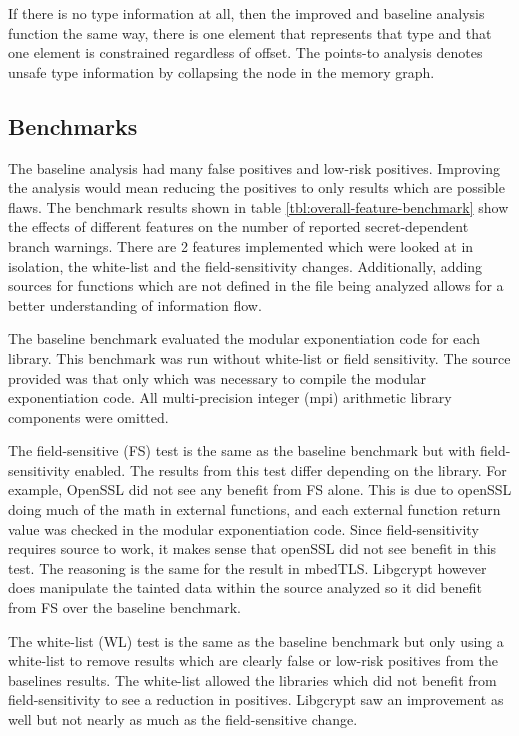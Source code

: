 If there is no type information at all, then the improved and baseline analysis
function the same way, there is one element that represents that type and that
one element is constrained regardless of offset. The points-to analysis denotes
unsafe type information by collapsing the node in the memory graph.
\subsection{Benchmarks}

The baseline analysis had many false positives and low-risk positives. Improving
the analysis would mean reducing the positives to only results which are
possible flaws. The benchmark results shown in table
\ref{tbl:overall-feature-benchmark} show the effects of different features on
the number of reported secret-dependent branch warnings. There are 2 features
implemented which were looked at in isolation, the white-list and the
field-sensitivity changes. Additionally, adding sources for functions which are
not defined in the file being analyzed allows for a better understanding of
information flow.

The baseline benchmark evaluated the modular exponentiation code for each
library. This benchmark was run without white-list or field sensitivity. The
source provided was that only which was necessary to compile the modular
exponentiation code. All multi-precision integer (mpi) arithmetic library components
were omitted.

The field-sensitive (FS) test is the same as the baseline benchmark but with
field-sensitivity enabled. The results from this test differ depending on the
library. For example, OpenSSL did not see any benefit from FS alone. This is due
to openSSL doing much of the math in external functions, and each external
function return value was checked in the modular exponentiation code. Since
field-sensitivity requires source to work, it makes sense that openSSL did not
see benefit in this test. The reasoning is the same for the result in mbedTLS.
Libgcrypt however does manipulate the tainted data within the source analyzed so
it did benefit from FS over the baseline benchmark.

The white-list (WL) test is the same as the baseline benchmark but only using a
white-list to remove results which are clearly false or low-risk positives from
the baselines results. The white-list allowed the libraries which did not
benefit from field-sensitivity to see a reduction in positives. Libgcrypt saw an
improvement as well but not nearly as much as the field-sensitive change.

